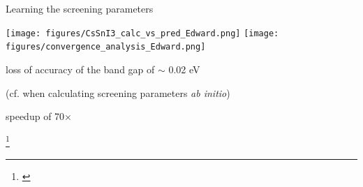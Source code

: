 \documentclass[xcolor=table,aspectratio=169]{beamer}
\newcommand\blfootcite[1]{%
  \begingroup
  \renewcommand\thefootnote{}\footnote{\hspace{-4ex}\cite{#1}}%
  \addtocounter{footnote}{-1}%
  \endgroup
}
\numberwithin{equation}{section}
\newcommand{\backupend}{
   \setcounter{framenumber}{\value{finalframe}}
}
\begin{document}
\begin{frame}{Learning the screening parameters}
   \begin{center}

      \texttt{[image: figures/CsSnI3\_calc\_vs\_pred\_Edward.png]}
      \texttt{[image: figures/convergence\_analysis\_Edward.png]}

      loss of accuracy of the band gap of $\sim$ 0.02 eV

      (cf. when calculating screening parameters \emph{ab initio})

      speedup of 70$\times$
   \end{center}

   \blfootcite{Schubert2022}

\end{frame}


\backupend
\end{document}
